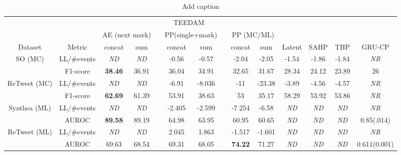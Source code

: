 \documentclass[journal,twoside,web]{ieeecolor}
\begin{document}
\begin{table}[htbp]
    \centering
    \caption{Add caption}
      \begin{tabular}{cccccccccccccc}
      \toprule
      \toprule
            &       & \multicolumn{8}{c}{TEEDAM}                                    &       &       &       &  \\
  \cmidrule{3-10}          &       & \multicolumn{2}{c}{AE (next mark)} &       & \multicolumn{2}{c}{PP(single+mark)} &       & \multicolumn{2}{c}{PP (MC/ML)} &       &       &       &  \\
  \cmidrule{3-4}\cmidrule{6-7}\cmidrule{9-10}    Dataset & Metric & concat & sum   &       & concat & sum   &       & concat & sum   & Latent & SAHP  & THP   & GRU-CP \\
      \midrule
      \multirow{2}[2]{*}{SO (MC)} & LL/\#events & \textit{ND} & \textit{ND} &       & -0.56 & -0.57 &       & -2.04 & -2.05 & -1.54 & -1.86 & -1.84 & \textit{NR} \\
            & F1-score & \textbf{38.46} & 36.91 &       & 36.04 & 34.91 &       & 32.65 & 31.67 & 28.34 & 24.12 & 23.89 & 26 \\
      \midrule
      \multirow{2}[2]{*}{ReTweet (MC)} & LL/\#events & \textit{ND} & \textit{ND} &       & -6.91 & -8.036 &       & -11   & -23.38 & -3.89 & -4.56 & -4.57 & \textit{NR} \\
            & F1-score & \textbf{62.69} & 61.39 &       & 53.91 & 38.63 &       & 53    & 35.17 & 58.29 & 53.92 & 53.86 & \textit{NR} \\
      \midrule
      \multirow{2}[2]{*}{Synthea (ML)} & LL/\#events & \textit{ND} & \textit{ND} &       & -2.405 & -2.599 &       & -7.254 & -6.58 & \textit{ND} & \textit{ND} & \textit{ND} & \textit{NR} \\
            & AUROC & \textbf{89.58} & 89.19 &       & 64.98 & 63.95 &       & 60.95 & 60.65 & \textit{ND} & \textit{ND} & \textit{ND} & 0.85(.014) \\
      \midrule
      \multirow{2}[2]{*}{ReTweet (ML)} & LL/\#events & \textit{ND} & \textit{ND} &       & 2.045 & 1.863 &       & -1.517 & -1.601 & \textit{ND} & \textit{ND} & \textit{ND} & \textit{NR} \\
            & AUROC & 69.63 & 68.54 &       & 69.31 & 68.05 &       & \textbf{74.22} & 71.27 & \textit{ND} & \textit{ND} & \textit{ND} & 0.611(0.001) \\
      \bottomrule
      \bottomrule
      \end{tabular}%
    \label{tab:1}%
  \end{table}%
\end{document}
